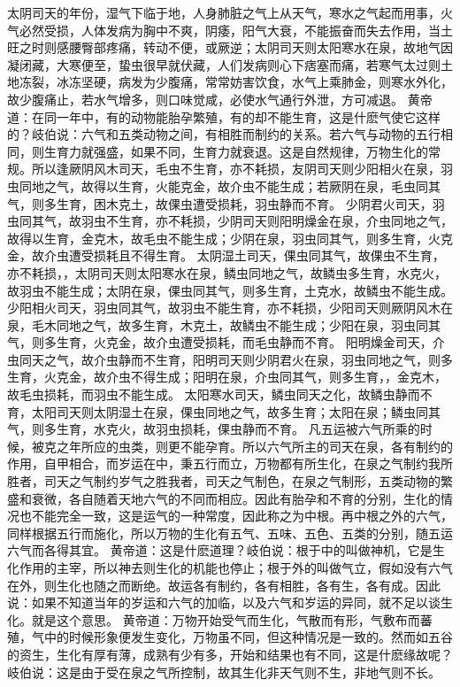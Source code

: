 \documentclass[a4paper,12pt,UTF8,twoside]{ctexbook}
\begin{document}
太阴司天的年份，湿气下临于地，人身肺脏之气上从天气，寒水之气起而用事，火气必然受损，人体发病为胸中不爽，阴痿，阳气大衰，不能振奋而失去作用，当土旺之时则感腰臀部疼痛，转动不便，或厥逆；太阴司天则太阳寒水在泉，故地气因凝闭藏，大寒便至，蛰虫很早就伏藏，人们发病则心下痞塞而痛，若寒气太过则土地冻裂，冰冻坚硬，病发为少腹痛，常常妨害饮食，水气上乘肺金，则寒水外化，故少腹痛止，若水气增多，则口味觉咸，必使水气通行外泄，方可减退。
黄帝道：在同一年中，有的动物能胎孕繁殖，有的却不能生育，这是什麽气使它这样的？岐伯说：六气和五类动物之间，有相胜而制约的关系。若六气与动物的五行相同，则生育力就强盛，如果不同，生育力就衰退。这是自然规律，万物生化的常规。所以逢厥阴风木司天，毛虫不生育，亦不耗损，友阴司天则少阳相火在泉，羽虫同地之气，故得以生育，火能克金，故介虫不能生成；若厥阴在泉，毛虫同其气，则多生育，困木克土，故倮虫遭受损耗，羽虫静而不育。
少阴君火司天，羽虫同其气，故羽虫不生育，亦不耗损，少阴司天则阳明燥金在泉，介虫同地之气，故得以生育，金克木，故毛虫不能生成；少阴在泉，羽虫同其气，则多生育，火克金，故介虫遭受损耗且不得生育。
太阴湿土司天，倮虫同其气，故倮虫不生育，亦不耗损，，太阴司天则太阳寒水在泉，鳞虫同地之气，故鳞虫多生育，水克火，故羽虫不能生成；太阴在泉，倮虫同其气，则多生育，土克水，故鳞虫不能生成。
少阳相火司天，羽虫同其气，故羽虫不能生育，亦不耗损，少阳司天则厥阴风木在泉，毛木同地之气，故多生育，木克土，故鳞虫不能生成；少阳在泉，羽虫同其气，则多生育，火克金，故介虫遭受损耗，而毛虫静而不育。
阳明燥金司天，介虫同天之气，故介虫静而不生育，阳明司天则少阴君火在泉，羽虫同地之气，则多生育，火克金，故介虫不得生成；阳明在泉，介虫同其气，则多生育，，金克木，故毛虫损耗，而羽虫不能生成。
太阳寒水司天，鳞虫同天之化，故鳞虫静而不育，太阳司天则太阴湿土在泉，倮虫同地之气，故多生育；太阳在泉；鳞虫同其气，则多生育，水克火，故羽虫损耗，倮虫静而不育。
凡五运被六气所乘的时候，被克之年所应的虫类，则更不能孕育。所以六气所主的司天在泉，各有制约的作用，自甲相合，而岁运在中，秉五行而立，万物都有所生化，在泉之气制约我所胜者，司天之气制约岁气之胜我者，司天之气制色，在泉之气制形，五类动物的繁盛和衰微，各自随着天地六气的不同而相应。因此有胎孕和不育的分别，生化的情况也不能完全一致，这是运气的一种常度，因此称之为中根。再中根之外的六气，同样根据五行而施化，所以万物的生化有五气、五味、五色、五类的分别，随五运六气而各得其宜。
黄帝道：这是什麽道理？岐伯说：根于中的叫做神机，它是生化作用的主宰，所以神去则生化的机能也停止；根于外的叫做气立，假如没有六气在外，则生化也随之而断绝。故运各有制约，各有相胜，各有生，各有成。因此说：如果不知道当年的岁运和六气的加临，以及六气和岁运的异同，就不足以谈生化。就是这个意思。
黄帝道：万物开始受气而生化，气散而有形，气敷布而蕃殖，气中的时候形象便发生变化，万物虽不同，但这种情况是一致的。然而如五谷的资生，生化有厚有薄，成熟有少有多，开始和结果也有不同，这是什麽缘故呢？岐伯说：这是由于受在泉之气所控制，故其生化非天气则不生，非地气则不长。
\end{document}
